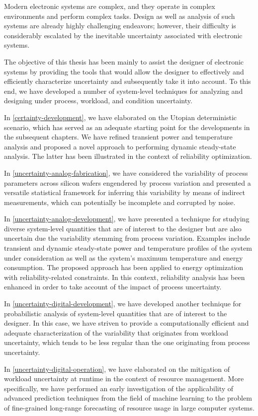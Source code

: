 Modern electronic systems are complex, and they operate in complex environments
and perform complex tasks. Design as well as analysis of such systems are
already highly challenging endeavors; however, their difficulty is considerably
escalated by the inevitable uncertainty associated with electronic systems.

The objective of this thesis has been mainly to assist the designer of
electronic systems by providing the tools that would allow the designer to
effectively and efficiently characterize uncertainty and subsequently take it
into account. To this end, we have developed a number of system-level techniques
for analyzing and designing under process, workload, and condition uncertainty.

In \cref{certainty-development}, we have elaborated on the Utopian deterministic
scenario, which has served as an adequate starting point for the developments in
the subsequent chapters. We have refined transient power and temperature
analysis and proposed a novel approach to performing dynamic steady-state
analysis. The latter has been illustrated in the context of reliability
optimization.

In \cref{uncertainty-analog-fabrication}, we have considered the variability of
process parameters across silicon wafers engendered by process variation and
presented a versatile statistical framework for inferring this variability by
means of indirect measurements, which can potentially be incomplete and
corrupted by noise.

In \cref{uncertainty-analog-development}, we have presented a technique for
studying diverse system-level quantities that are of interest to the designer
but are also uncertain due the variability stemming from process variation.
Examples include transient and dynamic steady-state power and temperature
profiles of the system under consideration as well as the system's maximum
temperature and energy consumption. The proposed approach has been applied to
energy optimization with reliability-related constraints. In this context,
reliability analysis has been enhanced in order to take account of the impact of
process uncertainty.

In \cref{uncertainty-digital-development}, we have developed another technique
for probabilistic analysis of system-level quantities that are of interest to
the designer. In this case, we have striven to provide a computationally
efficient and adequate characterization of the variability that originates from
workload uncertainty, which tends to be less regular than the one originating
from process uncertainty.

In \cref{uncertainty-digital-operation}, we have elaborated on the mitigation of
workload uncertainty at runtime in the context of resource management. More
specifically, we have performed an early investigation of the applicability of
advanced prediction techniques from the field of machine learning to the problem
of fine-grained long-range forecasting of resource usage in large computer
systems.
